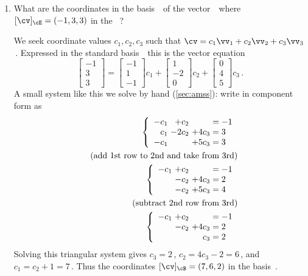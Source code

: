 \begin{example}
\begin{enumerate}
\item What are the coordinates in the basis~\cB\ of the vector~\cv\ where \([\cv]_\cE=(-1,3,3)\) in the ~\cE?
\begin{solution} 
We seek coordinate values \(c_1,c_2,c_3\) such that \(\cv=c_1\vv_1+c_2\vv_2+c_3\vv_3\)\,. 
Expressed in the standard basis~\cE\ this is the vector equation
\begin{equation*}
\begin{bmatrix} -1\\3\\3 \end{bmatrix}=
\begin{bmatrix} -1\\1\\-1 \end{bmatrix}c_1+
\begin{bmatrix} 1\\-2\\0 \end{bmatrix}c_2+
\begin{bmatrix} 0\\4\\5 \end{bmatrix}c_3\,.
\end{equation*}
A small system like this we solve by hand (\cref{sec:amss}): write in component form as
\begin{eqnarray*}
&&\left\{\begin{array}{r@{\ }r@{\ }r@{{}={}}l}  
-c_1&+c_2&&-1 \\
c_1&-2c_2&+4c_3&3 \\
-c_1&&+5c_3&3
\end{array}\right.
\\&&(\text{add 1st row to 2nd and take from 3rd})
\\&&\left\{\begin{array}{r@{\ }r@{\ }r@{{}={}}l}  
-c_1&+c_2&&-1 \\
&-c_2&+4c_3&2 \\
&-c_2&+5c_3&4
\end{array}\right.
\\&&(\text{subtract 2nd row from 3rd})
\\&&\left\{\begin{array}{r@{\ }r@{\ }r@{{}={}}l}  
-c_1&+c_2&&-1 \\
&-c_2&+4c_3&2 \\
&&c_3&2
\end{array}\right.
\end{eqnarray*}
Solving this triangular system gives \(c_3=2\)\,, \(c_2=4c_3-2=6\)\,, and \(c_1=c_2+1=7\)\,.
Thus the coordinates \([\cv]_\cB=(7,6,2)\) in the basis~\cB.
\end{solution}



\end{enumerate}
\end{example}
